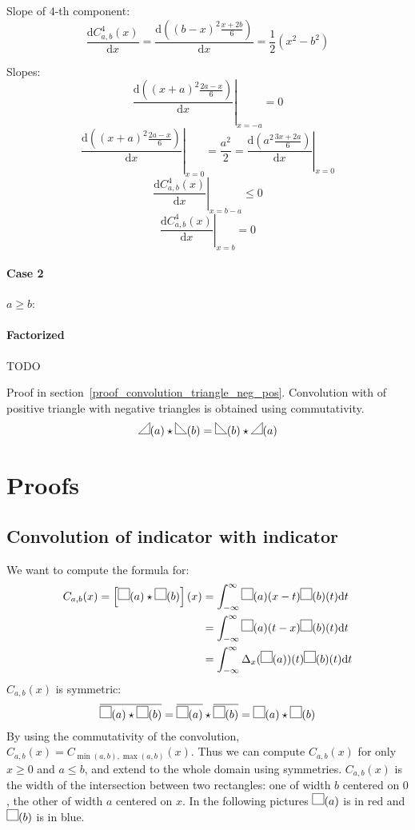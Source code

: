 \documentclass[a4paper,10pt]{article}
\newcommand\Shifted[2]{\Delta_{#1}(#2)}
\newcommand\Reversed[1]{\overline{#1}}
\newcommand\SymSquare{\begin{tikzpicture}%
        \draw (0,0) -- (0,1em) -- (1em,1em) -- (1em,0) -- cycle;
\end{tikzpicture}}
\newcommand\Indicator[1]{\SymSquare(#1)}
\newcommand\SymPositiveTriangle{\begin{tikzpicture}%
        \draw (0,0) -- (1em,0em) -- (1em,1em) -- cycle;
\end{tikzpicture}}
\newcommand\PositiveTriangle[1]{\SymPositiveTriangle(#1)}
\newcommand\SymNegativeTriangle{\begin{tikzpicture}%
        \draw (0,0) -- (0,1em) -- (1em,0em) -- cycle;
\end{tikzpicture}}
\newcommand\NegativeTriangle[1]{\SymNegativeTriangle(#1)}
\newcommand\D{\mathrm{d}}
\newcommand\Convolution{\star}
\newcommand\ConvolutionInt[2]{\int_{-\infty}^{\infty}#1 \D#2}
\begin{document}
Slope of $4$-th component:
\[  \frac{\D C_{a,b}^4(x)}{\D x} = \frac{\D((b-x)^2 \frac{x+2b}{6})}{\D x} = \frac{1}{2}(x^2-b^2) \]

Slopes:
\[ \left. \frac{\D((x+a)^2 \frac{2a-x}{6})}{\D x} \right|_{x=-a} = 0 \]
\[ \left. \frac{\D((x+a)^2 \frac{2a-x}{6})}{\D x} \right|_{x=0} = \frac{a^2}{2} = \left. \frac{\D(a^2 \frac{3x+2a}{6})}{\D x} \right|_{x=0} \]
\[ \left. \frac{\D C_{a,b}^4(x)}{\D x} \right|_{x=b-a} \le 0 \]
\[ \left. \frac{\D C_{a,b}^4(x)}{\D x} \right|_{x=b} = 0 \]

\paragraph{Case 2}
$a \ge b$:

\paragraph{Factorized}
TODO

Proof in section~\ref{proof_convolution_triangle_neg_pos}.
Convolution with of positive triangle with negative triangles is obtained using commutativity.
\[ \PositiveTriangle{a} \Convolution \NegativeTriangle{b} = \NegativeTriangle {b} \Convolution \PositiveTriangle{a} \]

\section{Proofs}

\subsection{Convolution of indicator with indicator}\label{proof_convolution_indicator_indicator}

We want to compute the formula for:
\[ \begin{split}
    C_{a,b}(x) = \left[ \Indicator{a} \Convolution \Indicator{b} \right] (x) & = \ConvolutionInt{\Indicator{a}(x-t) \Indicator{b}(t)}{t} \\
    & = \ConvolutionInt{\Indicator{a}(t-x) \Indicator{b}(t)}{t} \\
    & = \ConvolutionInt{\Shifted{x}{\Indicator{a}}(t) \Indicator{b}(t)}{t}
\end{split} \]
$C_{a,b}(x)$ is symmetric:
\[
    \Reversed{\Indicator{a} \Convolution \Indicator{b}} =
    \Reversed{\Indicator{a}} \Convolution \Reversed{\Indicator{b}} =
    \Indicator{a} \Convolution \Indicator{b}
\]
By using the commutativity of the convolution, $C_{a,b}(x) = C_{\min(a,b),\max(a,b)}(x)$.
Thus we can compute $C_{a,b}(x)$ for only $x \ge 0$ and $a \le b$, and extend to the whole domain using symmetries.
$C_{a,b}(x)$ is the width of the intersection between two rectangles: one of width $b$ centered on $0$, the other of width $a$ centered on $x$.
In the following pictures $\Indicator{a}$ is in red and $\Indicator{b}$ is in blue.
\end{document}
